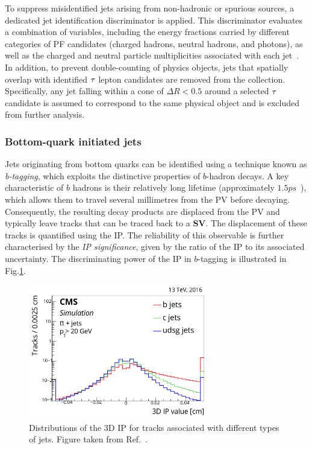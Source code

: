 To suppress misidentified jets arising from non-hadronic or spurious sources, a dedicated jet identification discriminator is applied. This discriminator evaluates a combination of variables, including the energy fractions carried by different categories of \ac{PF} candidates (charged hadrons, neutral hadrons, and photons), as well as the charged and neutral particle multiplicities associated with each jet~\cite{Jet_Algorithm_Performance}. In addition, to prevent double-counting of physics objects, jets that spatially overlap with identified $\tau$ lepton candidates are removed from the collection. Specifically, any jet falling within a cone of $\Delta R < 0.5$ around a selected $\tau$ candidate is assumed to correspond to the same physical object and is excluded from further analysis.

\subsubsection{Bottom-quark initiated jets}

Jets originating from bottom quarks can be identified using a technique known as \textit{b-tagging}, which exploits the distinctive properties of $b$-hadron decays. A key characteristic of $b$ hadrons is their relatively long lifetime (approximately $1.5\unit{ps}$~\cite{ParticleMasses}), which allows them to travel several millimetres from the \ac{PV} before decaying. Consequently, the resulting decay products are displaced from the \ac{PV} and typically leave tracks that can be traced back to a \textbf{\ac{SV}}. The displacement of these tracks is quantified using the \ac{IP}. The reliability of this observable is further characterised by the \textit{\ac{IP} significance}, given by the ratio of the \ac{IP} to its associated uncertainty. The discriminating power of the \ac{IP} in $b$-tagging is illustrated in Fig.\ref{Figure:Chapter4_IP_bjets}.

\begin{figure}[h]
\centering
\includegraphics[width=0.7\textwidth]{Figures/Chapter4/IP_bjets.pdf}
\caption[Distributions of the 3D impact parameter for tracks associated with different types of jets]{Distributions of the 3D \ac{IP} for tracks associated with different types of jets. Figure taken from Ref.~\cite{HeavyFlavourJets_ID}.}
\label{Figure:Chapter4_IP_bjets}
\end{figure}

